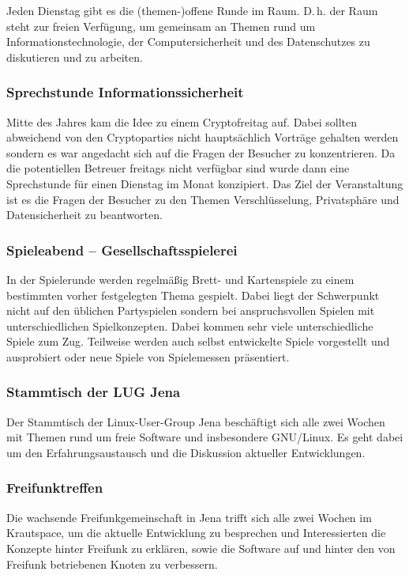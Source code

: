 \documentclass[ngerman]{scrartcl}
\begin{document}
Jeden Dienstag gibt es die (themen-)offene Runde im Raum. D.\,h. der Raum
steht zur freien Verfügung, um gemeinsam an Themen rund um
Informationstechnologie, der Computersicherheit und des
Datenschutzes zu diskutieren und zu arbeiten.

\subsubsection{Sprechstunde Informationssicherheit}

Mitte des Jahres kam die Idee zu einem Cryptofreitag auf. 
Dabei sollten abweichend von den Cryptoparties nicht hauptsächlich Vorträge gehalten werden sondern es war angedacht sich auf die Fragen der Besucher zu konzentrieren. 
Da die potentiellen Betreuer freitags nicht verfügbar sind wurde dann eine Sprechstunde für einen Dienstag im Monat konzipiert. 
Das Ziel der Veranstaltung ist es die Fragen der Besucher zu den Themen Verschlüsselung, Privatsphäre und Datensicherheit zu beantworten. 

\subsubsection{Spieleabend -- Gesellschaftsspielerei}

In der Spielerunde werden regelmäßig Brett- und Kartenspiele zu einem
bestimmten vorher festgelegten Thema gespielt. Dabei liegt der Schwerpunkt
nicht auf den üblichen Partyspielen sondern bei anspruchsvollen Spielen mit
unterschiedlichen Spielkonzepten. Dabei kommen sehr viele unterschiedliche
Spiele zum Zug. Teilweise werden auch selbst entwickelte Spiele vorgestellt
und ausprobiert oder neue Spiele von Spielemessen präsentiert.

\subsubsection{Stammtisch der LUG Jena}

Der Stammtisch der Linux-User-Group Jena beschäftigt sich alle zwei Wochen
mit Themen rund um freie Software und insbesondere GNU/Linux. Es geht dabei
um den Erfahrungsaustausch und die Diskussion aktueller Entwicklungen.

\subsubsection{Freifunktreffen}

Die wachsende Freifunkgemeinschaft in Jena trifft sich alle zwei Wochen
im Krautspace, um die aktuelle Entwicklung zu besprechen und
Interessierten die Konzepte hinter Freifunk zu erklären, sowie die
Software auf und hinter den von Freifunk betriebenen Knoten zu
verbessern.
\end{document}
